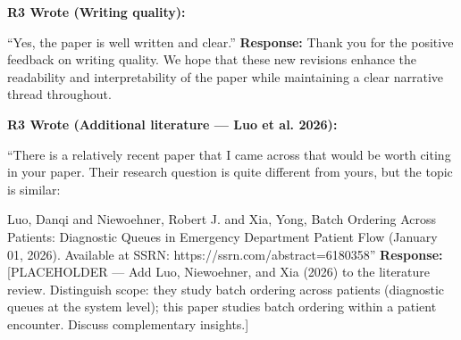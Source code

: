 \documentclass[11pt]{article}
\newenvironment{quote2}
{ \bigskip
\noindent
         \small\em
         \baselineskip=14pt
}
\newcommand{\1}{\hbox{\rm 1\kern-.35em 1}}
\begin{document}
\begin{quote2}
\textbf{R3 Wrote (Writing quality):}

\noindent ``Yes, the paper is well written and clear.''
\end{quote2}

\noindent\textbf{Response:} \color{blue}Thank you for the positive feedback on writing quality. We hope that these new revisions enhance the readability and interpretability of the paper while maintaining a clear narrative thread throughout.
\color{black}

\begin{quote2}
\textbf{R3 Wrote (Additional literature --- Luo et al. 2026):}

\noindent ``There is a relatively recent paper that I came across that would be worth citing in your paper. Their research question is quite different from yours, but the topic is similar:

Luo, Danqi and Niewoehner, Robert J. and Xia, Yong, Batch Ordering Across Patients: Diagnostic Queues in Emergency Department Patient Flow (January 01, 2026). Available at SSRN: https://ssrn.com/abstract=6180358''
\end{quote2}

\noindent\textbf{Response:} \color{blue}[PLACEHOLDER --- Add Luo, Niewoehner, and Xia (2026) to the literature review. Distinguish scope: they study batch ordering across patients (diagnostic queues at the system level); this paper studies batch ordering within a patient encounter. Discuss complementary insights.]
\color{black}


\clearpage
\end{document}
